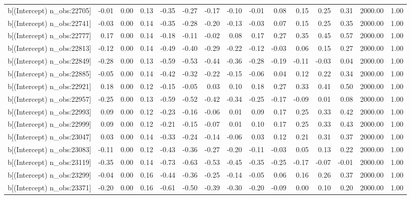 \begin{table}[ht]
\begin{tabular}{rrrrrrrrrrrrrrr}
  b[(Intercept) n\_obs:22705] & -0.01 & 0.00 & 0.13 & -0.35 & -0.27 & -0.17 & -0.10 & -0.01 & 0.08 & 0.15 & 0.25 & 0.31 & 2000.00 & 1.00 \\ 
  b[(Intercept) n\_obs:22741] & -0.03 & 0.00 & 0.14 & -0.35 & -0.28 & -0.20 & -0.13 & -0.03 & 0.07 & 0.15 & 0.25 & 0.35 & 2000.00 & 1.00 \\ 
  b[(Intercept) n\_obs:22777] & 0.17 & 0.00 & 0.14 & -0.18 & -0.11 & -0.02 & 0.08 & 0.17 & 0.27 & 0.35 & 0.45 & 0.57 & 2000.00 & 1.00 \\ 
  b[(Intercept) n\_obs:22813] & -0.12 & 0.00 & 0.14 & -0.49 & -0.40 & -0.29 & -0.22 & -0.12 & -0.03 & 0.06 & 0.15 & 0.27 & 2000.00 & 1.00 \\ 
  b[(Intercept) n\_obs:22849] & -0.28 & 0.00 & 0.13 & -0.59 & -0.53 & -0.44 & -0.36 & -0.28 & -0.19 & -0.11 & -0.03 & 0.04 & 2000.00 & 1.00 \\ 
  b[(Intercept) n\_obs:22885] & -0.05 & 0.00 & 0.14 & -0.42 & -0.32 & -0.22 & -0.15 & -0.06 & 0.04 & 0.12 & 0.22 & 0.34 & 2000.00 & 1.00 \\ 
  b[(Intercept) n\_obs:22921] & 0.18 & 0.00 & 0.12 & -0.15 & -0.05 & 0.03 & 0.10 & 0.18 & 0.27 & 0.33 & 0.41 & 0.50 & 2000.00 & 1.00 \\ 
  b[(Intercept) n\_obs:22957] & -0.25 & 0.00 & 0.13 & -0.59 & -0.52 & -0.42 & -0.34 & -0.25 & -0.17 & -0.09 & 0.01 & 0.08 & 2000.00 & 1.00 \\ 
  b[(Intercept) n\_obs:22993] & 0.09 & 0.00 & 0.12 & -0.23 & -0.16 & -0.06 & 0.01 & 0.09 & 0.17 & 0.25 & 0.33 & 0.42 & 2000.00 & 1.00 \\ 
  b[(Intercept) n\_obs:22999] & 0.09 & 0.00 & 0.12 & -0.21 & -0.15 & -0.07 & 0.01 & 0.10 & 0.17 & 0.25 & 0.33 & 0.43 & 2000.00 & 1.00 \\ 
  b[(Intercept) n\_obs:23047] & 0.03 & 0.00 & 0.14 & -0.33 & -0.24 & -0.14 & -0.06 & 0.03 & 0.12 & 0.21 & 0.31 & 0.37 & 2000.00 & 1.00 \\ 
  b[(Intercept) n\_obs:23083] & -0.11 & 0.00 & 0.12 & -0.43 & -0.36 & -0.27 & -0.20 & -0.11 & -0.03 & 0.05 & 0.13 & 0.22 & 2000.00 & 1.00 \\ 
  b[(Intercept) n\_obs:23119] & -0.35 & 0.00 & 0.14 & -0.73 & -0.63 & -0.53 & -0.45 & -0.35 & -0.25 & -0.17 & -0.07 & -0.01 & 2000.00 & 1.00 \\ 
  b[(Intercept) n\_obs:23299] & -0.04 & 0.00 & 0.16 & -0.44 & -0.36 & -0.25 & -0.14 & -0.05 & 0.06 & 0.16 & 0.26 & 0.37 & 2000.00 & 1.00 \\ 
  b[(Intercept) n\_obs:23371] & -0.20 & 0.00 & 0.16 & -0.61 & -0.50 & -0.39 & -0.30 & -0.20 & -0.09 & 0.00 & 0.10 & 0.20 & 2000.00 & 1.00 \\ 

\end{tabular}
\end{table}
